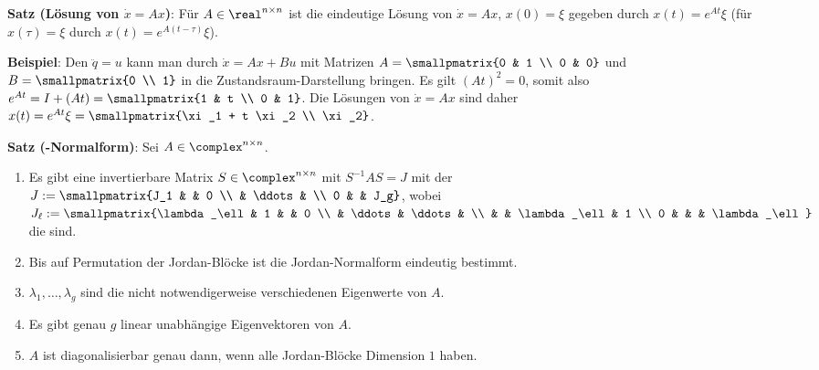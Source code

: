 \textbf{Satz (Lösung von $\dot{x} = Ax$)}:
Für $A \in \real^{n \times n}$ ist die eindeutige Lösung von $\dot{x} = Ax$, $x(0) = \xi$
gegeben durch $x(t) = e^{At} \xi$
(für $x(\tau) = \xi$ durch $x(t) = e^{A(t - \tau)} \xi$).

\textbf{Beispiel}:
Den  $\ddot{q} = u$ kann man durch
$\dot{x} = Ax + Bu$ mit Matrizen $A = \smallpmatrix{0 & 1 \\ 0 & 0}$ und
$B = \smallpmatrix{0 \\ 1}$ in die Zustandsraum-Darstellung bringen.
Es gilt $(At)^2 = 0$, somit also $e^{At} = I + (At) = \smallpmatrix{1 & t \\ 0 & 1}$.
Die Lösungen von $\dot{x} = Ax$ sind daher
$x(t) = e^{At} \xi = \smallpmatrix{\xi_1 + t \xi_2 \\ \xi_2}$.

\linie
\pagebreak

\textbf{Satz (-Normalform)}:
Sei $A \in \complex^{n \times n}$.
\begin{enumerate}
    \item
    Es gibt eine invertierbare Matrix $S \in \complex^{n \times n}$ mit
    $S^{-1} A S = J$
    mit der 
    $J := \smallpmatrix{J_1 & & 0 \\ & \ddots & \\ 0 & & J_g}$, wobei
    $J_\ell := \smallpmatrix{\lambda_\ell & 1 & & 0 \\ & \ddots & \ddots & \\
    & & \lambda_\ell & 1 \\ 0 & & & \lambda_\ell}$ die
     sind.
    
    \item
    Bis auf Permutation der Jordan-Blöcke ist die Jordan-Normalform eindeutig bestimmt.
    
    \item
    $\lambda_1, \dotsc, \lambda_g$ sind die nicht notwendigerweise verschiedenen
    Eigenwerte von $A$.
    
    \item
    Es gibt genau $g$ linear unabhängige Eigenvektoren von $A$.
    
    \item
    $A$ ist diagonalisierbar genau dann, wenn alle Jordan-Blöcke Dimension $1$ haben.
\end{enumerate}


